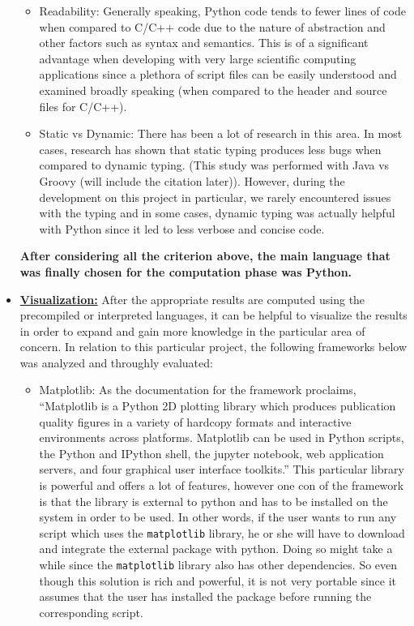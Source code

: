 \begin{itemize}
\begin{itemize}
        \item Readability: Generally speaking, Python code tends to fewer lines of code when compared to C/C++ code due to the nature of abstraction and other factors such as syntax and semantics. This is of a significant advantage when developing with very large scientific computing applications since a plethora of script files can be easily understood and examined broadly speaking (when compared to the header and source files for C/C++). 
        
        \item Static vs Dynamic: There has been a lot of research in this area. In most cases, research has shown that static typing produces less bugs when compared to dynamic typing. (This study was performed with Java vs Groovy (will include the citation later)). However, during the development on this project in particular, we rarely encountered issues with the typing and in some cases, dynamic typing was actually helpful with Python since it led to less verbose and concise code.  
    \end{itemize}
    
    \textbf{After considering all the criterion above, the main language that was finally chosen for the computation phase was Python.}
    
    \item \textbf{\underline{Visualization:}} After the appropriate results are computed using the precompiled or interpreted languages, it can be helpful to visualize the results in order to expand and gain more knowledge in the particular area of concern. In relation to this particular project, the following frameworks below was analyzed and throughly evaluated:
    
    
    \begin{itemize}
        \item Matplotlib: As the documentation for the framework proclaims, ``Matplotlib is a Python 2D plotting library which produces publication quality figures in a variety of hardcopy formats and interactive environments across platforms. Matplotlib can be used in Python scripts, the Python and IPython shell, the jupyter notebook, web application servers, and four graphical user interface toolkits.'' This particular library is powerful and offers a lot of features, however one con of the framework is that the library is external to python and has to be installed on the system in order to be used. In other words, if the user wants to run any script which uses the \verb|matplotlib| library, he or she will have to download and integrate the external package with python. Doing so might take a while since the \verb|matplotlib| library also has other dependencies. So even though this solution is rich and powerful, it is not very portable since it assumes that the user has installed the package before running the corresponding script.\newline
        

\end{itemize}
\end{itemize}
